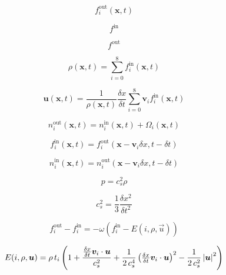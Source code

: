 \documentclass[a4paper,11pt]{article}
\newcommand{\vect}[1]{\boldsymbol{#1}}
\newcommand{\nonbfscalar}[2]{{#1}\cdot{#2}}
\newcommand*{\Scale}[2][4]{\scalebox{#1}{$#2$}}%
\begin{document}
\begin{equation}
f_i^\mathrm{out}(\vect{x},t)
\end{equation}

\begin{equation}
f^\mathrm{in}
\end{equation}

\begin{equation}
f^\mathrm{out}
\end{equation}

\begin{equation}
\rho(\vect{x},t) = \sum_{i=0}^{8} f_i^\mathrm{in}(\vect{x},t)
\end{equation}

\begin{equation}
\vect{u}(\vect{x},t) = \frac{1}{\rho(\vect{x},t)}\frac{\delta x}{\delta t}\sum_{i=0}^{8} \vect{v}_i f_i^\mathrm{in}(\vect{x},t)
\end{equation}

\begin{equation}
n_i^\mathrm{out}(\vect{x},t) = n_i^\mathrm{in}(\vect{x},t)+\Omega_i(\vect{x},t)
\end{equation}

\begin{equation}
f_i^\mathrm{in}(\vect{x},t) = f_i^\mathrm{out}(\vect{x}-\vect{v}_i\delta x, t-\delta t)
\end{equation}

\begin{equation}
n_i^\mathrm{in}(\vect{x},t) = n_i^\mathrm{out}(\vect{x}-\vect{v}_i\delta x, t-\delta t)
\end{equation}

\begin{equation}
p = c_s^2\rho
\end{equation}

\begin{equation}
c_s^2 = \frac{1}{3} \frac{\delta x^2}{\delta t^2}
\end{equation}

\begin{equation}
f_i^\mathrm{out} - f_i^\mathrm{in} = -\omega\left(f_i^\mathrm{in}-E(i,\rho,\vec{u})\right)
\end{equation}

\begin{equation}
E(i,\rho,\vect{u}) = \rho\, t_i\left(1+\frac{\nonbfscalar{\frac{\delta x}{\delta t}\vect{v}_i}{\vect{u}}}{c_s^2}+\frac{1}{2\,c_s^4}\left(\nonbfscalar{\Scale[1.0]{\frac{\delta x}{\delta t}}\vect{v}_i}{\vect{u}}\right)^2-\frac{1}{2\,c_s^2}\left|\vect{u}\right|^2\right)
\end{equation}
\end{document}
